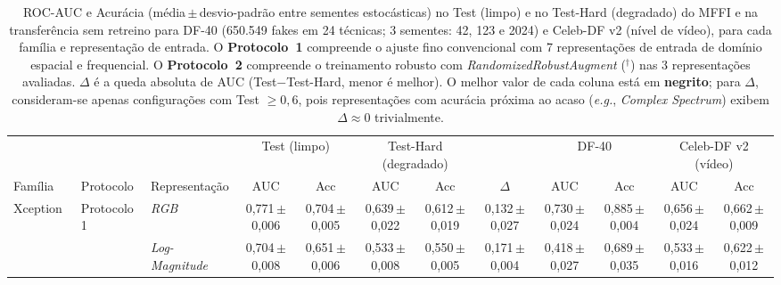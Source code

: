\providecommand{\pmsd}[2]{#1\,{\scriptsize$\pm$#2}}

\begin{table}[!t]
\centering
\caption{ROC-AUC e Acurácia (média\,$\pm$\,desvio-padrão entre sementes estocásticas) no Test (limpo) e no Test-Hard (degradado) do MFFI e na transferência sem retreino para DF-40 (650.549 fakes em 24 técnicas; 3 sementes: 42, 123 e 2024) e Celeb-DF v2 (nível de vídeo), para cada família e representação de entrada.
O \textbf{Protocolo~1} compreende o ajuste fino convencional com 7 representações de entrada de domínio espacial e frequencial.
O \textbf{Protocolo~2} compreende o treinamento robusto com \textit{RandomizedRobustAugment} ($^\dagger$) nas 3 representações avaliadas.
$\Delta$ é a queda absoluta de AUC (Test$-$Test-Hard, menor é melhor).
O melhor valor de cada coluna está em \textbf{negrito}; para $\Delta$, consideram-se apenas configurações com Test $\geq 0{,}6$, pois representações com acurácia próxima ao acaso (\textit{e.g.}, \textit{Complex Spectrum}) exibem $\Delta \approx 0$ trivialmente.}
\label{tab:familias_representacoes}
\vspace{-2mm}
\scriptsize\renewcommand{\arraystretch}{0.88}
\setlength{\tabcolsep}{2.0pt}
\begin{tabular}{@{}lll cc cc c cc cc@{}}
\toprule
 & & & \multicolumn{2}{c}{Test (limpo)} & \multicolumn{2}{c}{Test-Hard (degradado)} & & \multicolumn{2}{c}{DF-40} & \multicolumn{2}{c}{Celeb-DF v2 (vídeo)} \\
\cmidrule(lr){4-5}\cmidrule(lr){6-7}\cmidrule(lr){9-10}\cmidrule(lr){11-12}
Família & Protocolo & Representação & AUC & Acc & AUC & Acc & $\Delta$ & AUC & Acc & AUC & Acc \\
\midrule
Xception~\cite{chollet2017xception} & Protocolo 1 & \textit{RGB}                                       & \pmsd{0,771}{0,006} & \pmsd{0,704}{0,005} & \pmsd{0,639}{0,022} & \pmsd{0,612}{0,019} & \pmsd{0,132}{0,027} & \pmsd{0,730}{0,024} & \pmsd{0,885}{0,004} & \pmsd{0,656}{0,024} & \pmsd{0,662}{0,009} \\
                                    &             & \textit{Log-Magnitude}                             & \pmsd{0,704}{0,008} & \pmsd{0,651}{0,006} & \pmsd{0,533}{0,008} & \pmsd{0,550}{0,005} & \pmsd{0,171}{0,004} & \pmsd{0,418}{0,027} & \pmsd{0,689}{0,035} & \pmsd{0,533}{0,016} & \pmsd{0,622}{0,012} \\

\end{tabular}
\end{table}
